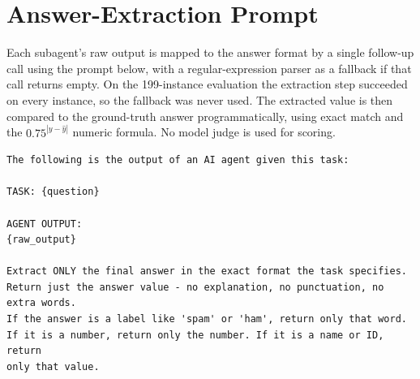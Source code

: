 \documentclass[sigconf,nonacm]{acmart}
\begin{document}
\section{Answer-Extraction Prompt}
\label{app:extract}
Each subagent's raw output is mapped to the answer format by a single follow-up call using
the prompt below, with a regular-expression parser as a fallback if that call returns empty.
On the 199-instance evaluation the extraction step succeeded on every instance, so the
fallback was never used. The extracted value is then compared to the ground-truth answer
programmatically, using exact match and the $0.75^{|y-\hat{y}|}$ numeric formula. No model
judge is used for scoring.

\begin{lstlisting}
The following is the output of an AI agent given this task:

TASK: {question}

AGENT OUTPUT:
{raw_output}

Extract ONLY the final answer in the exact format the task specifies.
Return just the answer value - no explanation, no punctuation, no extra words.
If the answer is a label like 'spam' or 'ham', return only that word.
If it is a number, return only the number. If it is a name or ID, return
only that value.
\end{lstlisting}

\end{document}

